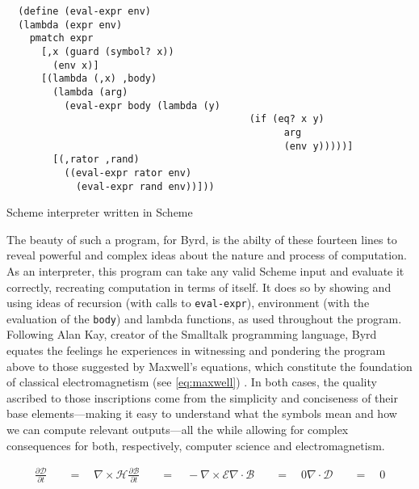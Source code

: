\begin{listing}
  \begin{verbatim}
  (define (eval-expr env)
  (lambda (expr env)
    pmatch expr
      [,x (guard (symbol? x))
        (env x)]
      [(lambda (,x) ,body)
        (lambda (arg)
          (eval-expr body (lambda (y)
                                          (if (eq? x y)
                                                arg
                                                (env y)))))]
        [(,rator ,rand)
          ((eval-expr rator env)
            (eval-expr rand env))]))
\end{verbatim}
  \caption{Scheme interpreter written in Scheme}
  \label{code:scheme_interpreter}
\end{listing}

The beauty of such a program, for Byrd, is the abilty of these fourteen lines to reveal powerful and complex ideas about the nature and process of computation. As an interpreter, this program can take any valid Scheme input and evaluate it correctly, recreating computation in terms of itself. It does so by showing and using ideas of recursion (with calls to \lstinline{eval-expr}), environment (with the evaluation of the \lstinline{body}) and lambda functions, as used throughout the program. Following Alan Kay, creator of the Smalltalk programming language, Byrd equates the feelings he experiences in witnessing and pondering the program above to those suggested by Maxwell's equations, which constitute the foundation of classical electromagnetism (see \ref{eq:maxwell}) \citep{kay_conversation_2004}. In both cases, the quality ascribed to those inscriptions come from the simplicity and conciseness of their base elements—making it easy to understand what the symbols mean and how we can compute relevant outputs—all the while allowing for complex consequences for both, respectively, computer science and electromagnetism.

\begin{listing}
  \begin{equation}
    \label{eq:maxwell}
    \begin{aligned}
      \frac{\partial\mathcal{D}}{\partial t} \quad & = \quad \nabla\times\mathcal{H}
      \frac{\partial\mathcal{B}}{\partial t} \quad & = \quad -\nabla\times\mathcal{E}
      \nabla\cdot\mathcal{B}                 \quad & = \quad 0
      \nabla\cdot\mathcal{D}                 \quad & = \quad 0
    \end{aligned}
  \end{equation}
\end{listing}


